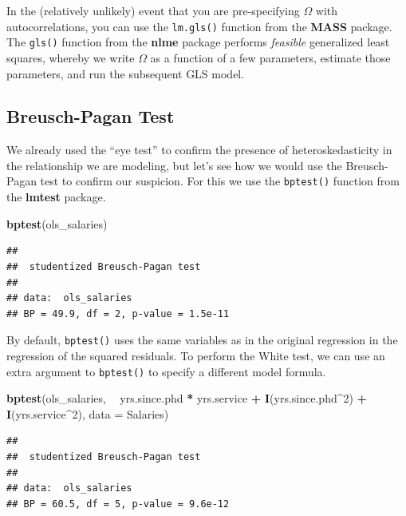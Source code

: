 \documentclass[12pt,oneside,openany]{book}
\newenvironment{Shaded}{\begin{snugshade}}{\end{snugshade}}
\newcommand{\KeywordTok}[1]{\textcolor[rgb]{0.13,0.29,0.53}{\textbf{#1}}}
\newcommand{\DataTypeTok}[1]{\textcolor[rgb]{0.13,0.29,0.53}{#1}}
\newcommand{\DecValTok}[1]{\textcolor[rgb]{0.00,0.00,0.81}{#1}}
\newcommand{\StringTok}[1]{\textcolor[rgb]{0.31,0.60,0.02}{#1}}
\newcommand{\OperatorTok}[1]{\textcolor[rgb]{0.81,0.36,0.00}{\textbf{#1}}}
\newcommand{\NormalTok}[1]{#1}
\begin{document}
In the (relatively unlikely) event that you are pre-specifying
\(\Omega\) with autocorrelations, you can use the \texttt{lm.gls()}
function from the \textbf{MASS} package. The \texttt{gls()} function
from the \textbf{nlme} package performs \emph{feasible} generalized
least squares, whereby we write \(\Omega\) as a function of a few
parameters, estimate those parameters, and run the subsequent GLS model.

\subsection{Breusch-Pagan Test}\label{breusch-pagan-test}

We already used the ``eye test'' to confirm the presence of
heteroskedasticity in the relationship we are modeling, but let's see
how we would use the Breusch-Pagan test to confirm our suspicion. For
this we use the \texttt{bptest()} function from the \textbf{lmtest}
package.

\begin{Shaded}
\begin{Highlighting}[]
\KeywordTok{bptest}\NormalTok{(ols_salaries)}
\end{Highlighting}
\end{Shaded}

\begin{verbatim}
## 
##  studentized Breusch-Pagan test
## 
## data:  ols_salaries
## BP = 49.9, df = 2, p-value = 1.5e-11
\end{verbatim}

By default, \texttt{bptest()} uses the same variables as in the original
regression in the regression of the squared residuals. To perform the
White test, we can use an extra argument to \texttt{bptest()} to specify
a different model formula.

\begin{Shaded}
\begin{Highlighting}[]
\KeywordTok{bptest}\NormalTok{(ols_salaries,}
       \OperatorTok{~}\StringTok{ }\NormalTok{yrs.since.phd }\OperatorTok{*}\StringTok{ }\NormalTok{yrs.service }\OperatorTok{+}\StringTok{ }\KeywordTok{I}\NormalTok{(yrs.since.phd}\OperatorTok{^}\DecValTok{2}\NormalTok{) }\OperatorTok{+}\StringTok{ }\KeywordTok{I}\NormalTok{(yrs.service}\OperatorTok{^}\DecValTok{2}\NormalTok{),}
       \DataTypeTok{data =}\NormalTok{ Salaries)}
\end{Highlighting}
\end{Shaded}

\begin{verbatim}
## 
##  studentized Breusch-Pagan test
## 
## data:  ols_salaries
## BP = 60.5, df = 5, p-value = 9.6e-12
\end{verbatim}
\end{document}
